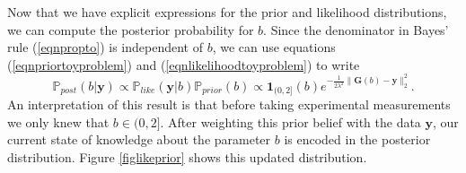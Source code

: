 \documentclass{sfuthesis}
\newcommand{\post}{\mathbb{P}_{post}}
\newcommand{\like}{\mathbb{P}_{like}}
\newcommand{\prior}{\mathbb{P}_{prior}}
\newcommand{\y}{\textbf{y}}
\begin{document}
Now that we have explicit expressions for the prior and likelihood distributions, we
can compute the posterior probability for $b$.
Since
the denominator in Bayes' rule (\ref{eqnpropto}) is independent of $b$, 
we can use equations (\ref{eqnpriortoyproblem}) and (\ref{eqnlikelihoodtoyproblem})  
to write 
\begin{equation}\label{eqnposteriorforb}
\post(b|\y)\propto\like(\y|b)\prior(b)\propto \textbf{1}_{(0,2]}(b)e^{-\frac{1}{2\lambda^{2}}\|\textbf{G}(b)-\textbf{y}\|_{2}^{2}}.
\end{equation}
An interpretation of this result is that before taking experimental measurements  we only knew 
that $b\in (0,2]$. After weighting this prior belief with the data $\y$, our current state of knowledge about the
parameter $b$ is encoded in the posterior distribution. Figure \ref{figlikeprior} shows this updated distribution.
%
%
\end{document}
